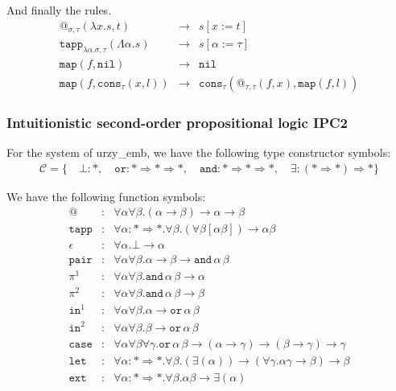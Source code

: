 \documentclass[runningheads,a4paper]{llncs}
\newcommand{\TypeConstructors}{\mathcal{C}}
\newcommand{\red}{\longrightarrow}
\newcommand{\arrtype}{\rightarrow}
\newcommand{\arrkind}{\Rightarrow}
\newcommand{\abs}[2]{\lambda #1.#2}
\newcommand{\tabs}[2]{\Lambda #1.#2}
\newcommand{\nil}{\mathtt{nil}}
\newcommand{\cons}{\mathtt{cons}}
\begin{document}
And finally the rules.
\[
\begin{array}{rcl}
@_{\sigma,\tau}(\abs{x}{s},t) & \red & s[x:=t] \\
\mathtt{tapp}_{\abs{\alpha}{\sigma},\tau}(\tabs{\alpha}{s}) & \red &
  s[\alpha:=\tau] \\
\mathtt{map}(f,\nil) & \red & \nil \\
\mathtt{map}(f,\cons_\tau(x,l)) & \red & \cons_\tau(@_{\tau,\tau}(f,x),\mathtt{map}(f,l))
\end{array}
\]

\subsubsection{Intuitionistic second-order propositional logic IPC2}

For the system of urzy\_emb, we have the following type constructor
symbols:
\[
\begin{array}{c}
\TypeConstructors = \{\quad
  \bot : *,\quad
  \mathtt{or} : * \arrkind * \arrkind *,\quad
  \mathtt{and} : * \arrkind * \arrkind *,\quad
  \exists : (* \arrkind *) \arrkind *
  \}
\end{array}
\]

We have the following function symbols:
\[
\begin{array}{rcl}
@ & : & \forall \alpha \forall \beta . (\alpha \arrtype \beta) \arrtype \alpha \arrtype \beta \\
\mathtt{tapp} & : & \forall \alpha : * \arrkind * . \forall \beta .
  (\forall \beta [\alpha \beta]) \arrtype \alpha \beta \\
\epsilon & : & \forall \alpha . \bot \arrtype \alpha \\
\mathtt{pair} & : & \forall \alpha \forall \beta . \alpha \arrtype \beta \arrtype
  \mathtt{and}\, \alpha\, \beta \\
\pi^1 & : & \forall \alpha \forall \beta . \mathtt{and}\, \alpha\, \beta \arrtype \alpha \\
\pi^2 & : & \forall \alpha \forall \beta . \mathtt{and}\, \alpha\, \beta \arrtype \beta \\
\mathtt{in}^1 & : & \forall \alpha \forall \beta . \alpha \arrtype
  \mathtt{or}\, \alpha\, \beta \\
\mathtt{in}^2 & : & \forall \alpha \forall \beta . \beta \arrtype
  \mathtt{or}\, \alpha\, \beta \\
\mathtt{case} & : & \forall \alpha \forall \beta \forall \gamma . \mathtt{or}\, \alpha\, \beta \arrtype
  (\alpha \arrtype \gamma) \arrtype (\beta \arrtype \gamma) \arrtype \gamma \\
\mathtt{let} & : & \forall \alpha : * \arrkind * . \forall \beta .
  (\exists (\alpha)) \arrtype
  (\forall \gamma . \alpha \gamma \arrtype \beta) \arrtype \beta \\
\mathtt{ext} & : & \forall \alpha : * \arrkind * . \forall \beta . \alpha \beta \arrtype
  \exists (\alpha)
\end{array}
\]
\end{document}
